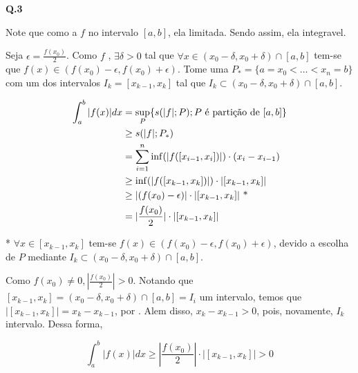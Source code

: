 \textbf{Q.3}

Note que como a \funcao $f$ \eh \continua no intervalo $[a,b]$, ela \tambem \eh limitada. Sendo assim, ela \eh integravel.

%

Seja $\epsilon = \frac{f(x_0)}{2}$. Como $f$ \continua, $\exists \delta > 0$ tal que $\forall x \in (x_0 - \delta, x_0 + \delta)\cap [a,b]$ tem-se que $f(x) \in (f(x_0) - \epsilon, f(x_0) + \epsilon)$. Tome uma \particao $P_* = \{a=x_0 < \ldots < x_n=b\}$ com um dos intervalos $I_k = [x_{k-1}, x_k]$ tal que $I_k \subset (x_0 - \delta, x_0 + \delta)\cap [a,b]$.

\begin{align*}
	\int_a^b|f(x)|dx &= \underset{P}{\sup}\{s(|f|;P); P \text{ \eh \particao de } [a,b]\} \\
	&\ge s(|f|;P_*) \\
	&= \sum_{i=1}^n \inf (|f([x_{i-1}, x_i])|)\cdot(x_i - x_{i-1}) \\
	&\ge \inf (|f([x_{k-1}, x_k])|)\cdot |[x_{k-1}, x_k]| \\
	&\ge |(f(x_0) - \epsilon)|\cdot |[x_{k-1}, x_k]| \text{ * }\\
	&= |\frac{f(x_0)}{2}|\cdot |[x_{k-1}, x_k]|
\end{align*}

* $\forall x \in [x_{k-1}, x_k]$ tem-se $f(x) \in (f(x_0) - \epsilon, f(x_0) + \epsilon)$, devido a escolha de $P$ mediante $I_k \subset (x_0 - \delta, x_0 + \delta)\cap [a,b]$.

Como $f(x_0) \neq 0, |\frac{f(x_0)}{2}| > 0$. Notando que $[x_{k-1}, x_k] = (x_0 - \delta, x_0 + \delta)\cap [a,b] = I_i$ \eh um intervalo, temos que $|[x_{k-1}, x_k]| = x_k - x_{k-1}$, por . Alem disso, $x_k - x_{k-1} > 0$, pois, novamente, $I_k$ \eh intervalo. Dessa forma,

$$
\int_a^b|f(x)|dx \ge |\frac{f(x_0)}{2}|\cdot |[x_{k-1}, x_k]| > 0
$$
